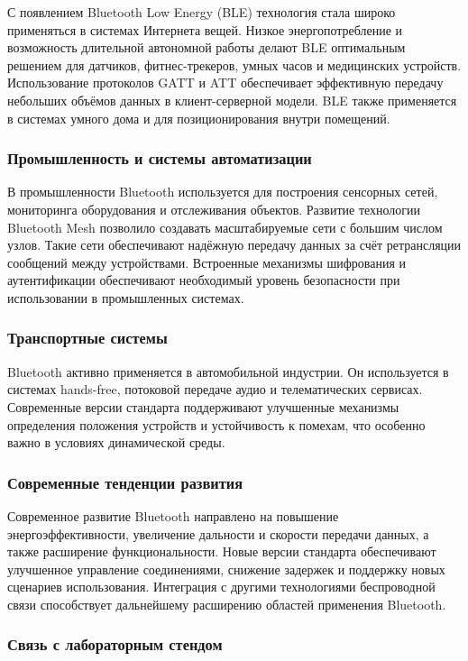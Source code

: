 С появлением Bluetooth Low Energy (BLE) технология стала широко применяться в системах Интернета вещей. Низкое энергопотребление и возможность длительной автономной работы делают BLE оптимальным решением для датчиков, фитнес-трекеров, умных часов и медицинских устройств. Использование протоколов GATT и ATT обеспечивает эффективную передачу небольших объёмов данных в клиент-серверной модели. BLE также применяется в системах умного дома и для позиционирования внутри помещений.

\subsubsection{Промышленность и системы автоматизации}

В промышленности Bluetooth используется для построения сенсорных сетей, мониторинга оборудования и отслеживания объектов. Развитие технологии Bluetooth Mesh позволило создавать масштабируемые сети с большим числом узлов. Такие сети обеспечивают надёжную передачу данных за счёт ретрансляции сообщений между устройствами. Встроенные механизмы шифрования и аутентификации обеспечивают необходимый уровень безопасности при использовании в промышленных системах.

\subsubsection{Транспортные системы}

Bluetooth активно применяется в автомобильной индустрии. Он используется в системах hands-free, потоковой передаче аудио и телематических сервисах. Современные версии стандарта поддерживают улучшенные механизмы определения положения устройств и устойчивость к помехам, что особенно важно в условиях динамической среды.

\subsubsection{Современные тенденции развития}

Современное развитие Bluetooth направлено на повышение энергоэффективности, увеличение дальности и скорости передачи данных, а также расширение функциональности. Новые версии стандарта обеспечивают улучшенное управление соединениями, снижение задержек и поддержку новых сценариев использования. Интеграция с другими технологиями беспроводной связи способствует дальнейшему расширению областей применения Bluetooth.

\subsubsection{Связь с лабораторным стендом}

